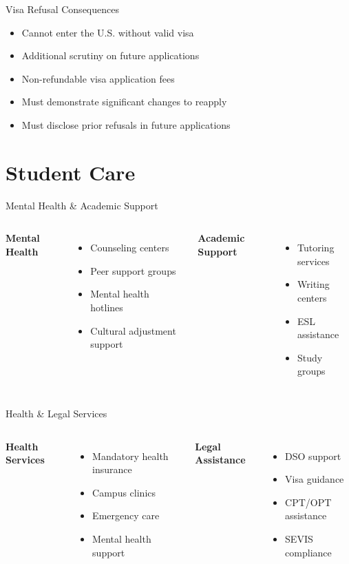 \documentclass{beamer}
\begin{document}
\begin{frame}{Visa Refusal Consequences}
\begin{itemize}
\item Cannot enter the U.S. without valid visa
\item Additional scrutiny on future applications
\item Non-refundable visa application fees
\item Must demonstrate significant changes to reapply
\item Must disclose prior refusals in future applications
\end{itemize}
\end{frame}

\section{Student Care}
\begin{frame}{Mental Health \& Academic Support}
\begin{columns}
\textbf{Mental Health}
\begin{itemize}
\item Counseling centers
\item Peer support groups
\item Mental health hotlines
\item Cultural adjustment support
\end{itemize}

\textbf{Academic Support}
\begin{itemize}
\item Tutoring services
\item Writing centers
\item ESL assistance
\item Study groups
\end{itemize}
\end{columns}
\end{frame}

\begin{frame}{Health \& Legal Services}
\begin{columns}
\textbf{Health Services}
\begin{itemize}
\item Mandatory health insurance
\item Campus clinics
\item Emergency care
\item Mental health support
\end{itemize}

\textbf{Legal Assistance}
\begin{itemize}
\item DSO support
\item Visa guidance
\item CPT/OPT assistance
\item SEVIS compliance
\end{itemize}
\end{columns}
\end{frame}
\end{document}
